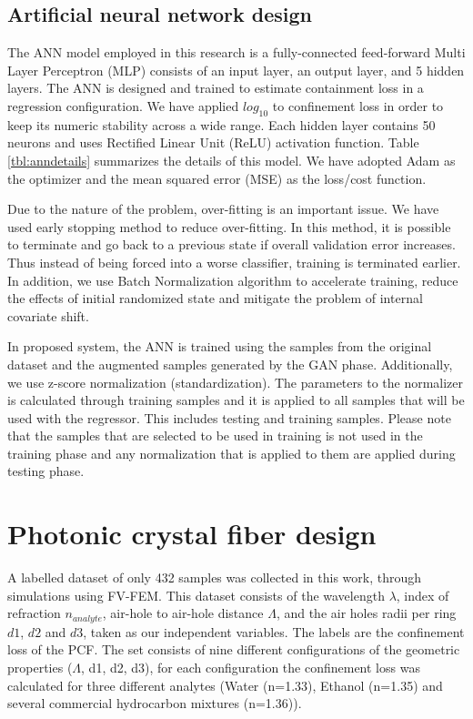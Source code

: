 \documentclass[draft, 10pt]{IEEEtran}
\begin{document}
\subsection{Artificial neural network design}
\label{ssec:ann}

The ANN model employed in this research is a fully-connected feed-forward Multi Layer Perceptron (MLP) consists of an input layer, an output layer, and 5 hidden layers. The ANN is designed and trained to estimate containment loss in a regression configuration. We have applied $log_{10}$ to confinement loss in order to keep its numeric stability across a wide range. Each hidden layer contains 50 neurons and uses Rectified Linear Unit (ReLU) activation function. Table \ref{tbl:anndetails} summarizes the details of this model. We have adopted Adam \cite{kingma2014adam} as the optimizer and the mean squared error (MSE) as the loss/cost function.

Due to the nature of the problem, over-fitting is an important issue. We have used early stopping method to reduce over-fitting. In this method, it is possible to terminate and go back to a previous state if overall validation error increases. Thus instead of being forced into a worse classifier, training is terminated earlier. In addition, we use Batch Normalization algorithm \cite{ioffe2015batch} to accelerate training, reduce the effects of initial randomized state and mitigate the problem of internal covariate shift.

In proposed system, the ANN is trained using the samples from the original dataset and the augmented samples generated by the GAN phase. Additionally, we use z-score normalization (standardization). The parameters to the normalizer is calculated through training samples and it is applied to all samples that will be used with the regressor. This includes testing and training samples. Please note that the samples that are selected to be used in training is not used in the training phase and any normalization that is applied to them are applied during testing phase.


\section{Photonic crystal fiber design}
\label{sec:pcf}

A labelled dataset of only 432 samples was collected in this work, through simulations using FV-FEM. This dataset consists of the wavelength $\lambda$, index of refraction $n_{analyte} $, air-hole to air-hole distance $ \Lambda $, and the air holes radii per ring $d1$, $d2$ and $d3$, taken as our independent variables. The labels are the confinement loss of the PCF. The set consists of nine different configurations of the geometric properties ($ \Lambda $, d1, d2, d3), for each configuration the confinement loss was calculated for three different analytes (Water (n=1.33), Ethanol (n=1.35) and several commercial hydrocarbon mixtures (n=1.36)).
\end{document}
